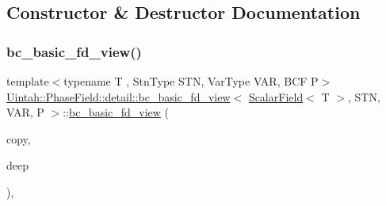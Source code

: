 \subsection{Constructor \& Destructor Documentation}
\mbox{\label{classUintah_1_1PhaseField_1_1detail_1_1bc__basic__fd__view_3_01ScalarField_3_01T_01_4_00_01STN_00_01VAR_00_01P_01_4_abb5dbc3676f8c31fd3fce28c505b941a}} 
\subsubsection{\texorpdfstring{bc\+\_\+basic\+\_\+fd\+\_\+view()}{bc\_basic\_fd\_view()}\hspace{0.1cm}{\footnotesize\ttfamily [1/4]}}
{\footnotesize\ttfamily template$<$typename T , Stn\+Type S\+TN, Var\+Type V\+AR, B\+CF P$>$ \\
\hyperlink{classUintah_1_1PhaseField_1_1detail_1_1bc__basic__fd__view}{Uintah\+::\+Phase\+Field\+::detail\+::bc\+\_\+basic\+\_\+fd\+\_\+view}$<$ \hyperlink{structUintah_1_1PhaseField_1_1ScalarField}{Scalar\+Field}$<$ T $>$, S\+TN, V\+AR, P $>$\+::\hyperlink{classUintah_1_1PhaseField_1_1detail_1_1bc__basic__fd__view}{bc\+\_\+basic\+\_\+fd\+\_\+view} (\begin{DoxyParamCaption}\item[{const \hyperlink{classUintah_1_1PhaseField_1_1detail_1_1bc__basic__fd__view}{bc\+\_\+basic\+\_\+fd\+\_\+view}$<$ \hyperlink{structUintah_1_1PhaseField_1_1ScalarField}{Scalar\+Field}$<$ T $>$, S\+TN, V\+AR, P $>$ $\ast$}]{copy,  }\item[{bool}]{deep }\end{DoxyParamCaption})\hspace{0.3cm}{\ttfamily [inline]}, {\ttfamily [protected]}}



